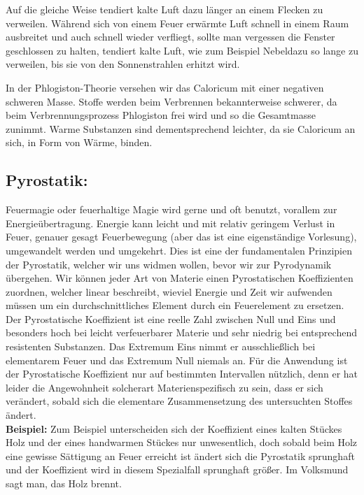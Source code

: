 \documentclass[a5paper,8pt]{book}
\begin{document}
Auf die gleiche Weise tendiert kalte Luft dazu länger an einem Flecken zu verweilen. Während sich von einem Feuer erwärmte 
Luft schnell in einem Raum ausbreitet und auch schnell wieder verfliegt, sollte man vergessen die Fenster geschlossen 
zu halten, tendiert kalte Luft, wie zum Beispiel Nebel\footnotemark[2] dazu so lange zu verweilen, bis sie von den Sonnenstrahlen 
erhitzt wird\footnotemark[3].

In der Phlogiston-Theorie versehen wir das Caloricum mit einer negativen schweren Masse. Stoffe werden beim Verbrennen 
bekannterweise schwerer, da beim Verbrennungsprozess Phlogiston frei wird und so die Gesamtmasse zunimmt. Warme Substanzen 
sind dementsprechend leichter, da sie Caloricum an sich, in Form von Wärme, binden.

\subsection{Pyrostatik:}
Feuermagie oder feuerhaltige Magie wird gerne und oft benutzt, vorallem zur Energieübertragung. Energie kann leicht und mit 
relativ geringem Verlust in Feuer, genauer gesagt Feuerbewegung (aber das ist eine eigenständige Vorlesung), umgewandelt 
werden und umgekehrt. Dies ist eine der fundamentalen Prinzipien der Pyrostatik, welcher wir uns widmen wollen, bevor wir 
zur Pyrodynamik übergehen.
Wir können jeder Art von Materie einen Pyrostatischen Koeffizienten zuordnen, welcher linear beschreibt, wieviel Energie 
und Zeit wir aufwenden müssen um ein durchschnittliches Element durch ein Feuerelement zu ersetzen. Der Pyrostatische 
Koeffizient ist eine reelle Zahl zwischen Null und Eins und besonders hoch bei leicht verfeuerbarer Materie und sehr 
niedrig bei entsprechend resistenten Substanzen. Das Extremum Eins nimmt er ausschließlich bei elementarem Feuer und das 
Extremum Null niemals an.
Für die Anwendung ist der Pyrostatische Koeffizient nur auf bestimmten Intervallen nützlich, denn er hat leider die 
Angewohnheit solcherart Materienspezifisch zu sein, dass er sich verändert, sobald sich die elementare Zusammensetzung des 
untersuchten Stoffes ändert.\\

\textbf{Beispiel:}
Zum Beispiel unterscheiden sich der Koeffizient eines kalten Stückes Holz und der eines handwarmen Stückes nur 
unwesentlich, doch sobald beim Holz eine 
gewisse Sättigung an Feuer erreicht ist ändert sich die Pyrostatik sprunghaft und der Koeffizient wird in diesem 
Spezialfall sprunghaft größer. Im Volksmund sagt man, das Holz brennt.\\
\end{document}
